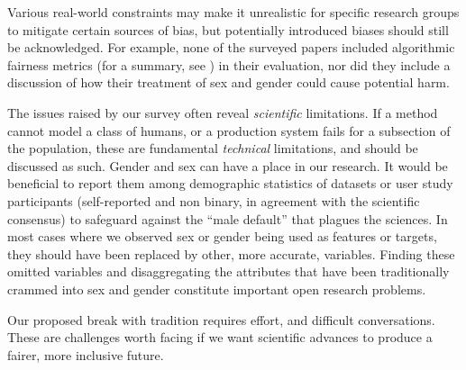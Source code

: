 \documentclass[sigconf,balance=false]{acmart}
\begin{document}
Various real-world constraints may make it unrealistic for specific research groups to mitigate certain sources of bias, but potentially introduced biases should still be acknowledged. For example, none of the surveyed papers included algorithmic fairness metrics (for a summary, see \cite{fairnesssurvey, fairnessmetrics}) in their evaluation, nor did they include a discussion of how their treatment of sex and gender could cause potential harm.

The issues raised by our survey often reveal \emph{scientific} limitations. If a method cannot model a class of humans, or a production system fails for a subsection of the population, these are fundamental \emph{technical} limitations, and should be discussed as such. Gender and sex can have a place in our research. It would be beneficial to report them among demographic statistics of datasets or user study participants (self-reported and non binary, in agreement with the scientific consensus) to
safeguard against the “male default” that plagues the sciences. In most cases where we observed sex or gender being used as features or targets, they should have been replaced by other, more accurate, variables. Finding these omitted variables and disaggregating the attributes that have been traditionally crammed into sex and gender constitute important open research problems.

Our proposed break with tradition requires effort, and difficult conversations. These are challenges worth facing if we want scientific advances to produce a fairer, more inclusive future.
\end{document}
